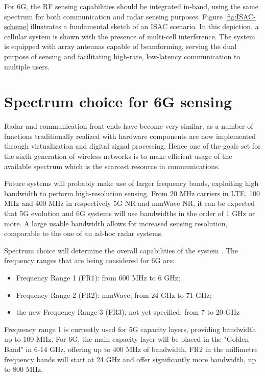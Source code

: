 For 6G, the RF sensing capabilities should be integrated in-band, using the same spectrum for both communication and radar sensing purposes. Figure \ref{fig:ISAC-scheme} illustrates a fundamental sketch of an ISAC scenario. In this depiction, a cellular system is shown with the presence of multi-cell interference. The system is equipped with array antennas capable of beamforming, serving the dual purpose of sensing and facilitating high-rate, low-latency communication to multiple users.

\section{Spectrum choice for 6G sensing}


Radar and communication front-ends have become very similar, as a number of functions traditionally realized with hardware components are now implemented through virtualization and digital signal processing. Hence one of the goals set for the sixth generation of wireless networks is to make efficient usage of the available spectrum which is the scarcest resource in communications.

Future systems will probably make use of larger frequency bands, exploiting high bandwidth to perform high-resolution sensing. From 20 MHz carriers in LTE, 100 MHz and 400 MHz in respectively 5G NR and mmWave NR, it can be expected that 5G evolution and 6G systems will use bandwidths in the order of 1 GHz or more. A large usable bandwidth allows for increased sensing resolution, comparable to the one of an ad-hoc radar systems.

Spectrum choice will determine the overall capabilities of the system \cite{Wild_Grudnitsky_Mandelli_Henninger_Guan_Schaich_2023}. The frequency ranges that are being considered for 6G \cite{Hexa} are:

\begin{itemize}
	\item Frequency Range 1 (FR1): from 600 MHz to 6 GHz;
	\item Frequency Range 2 (FR2): mmWave, from 24 GHz to 71 GHz;
	\item the new Frequency Range 3 (FR3), not yet specified: from 7 to 20 GHz
\end{itemize}

Frequency range 1 is currently used for 5G capacity layers, providing bandwidth up to 100 MHz. For 6G, the main capacity layer will be placed in the "Golden Band" in 6-14 GHz, offering up to 400 MHz of bandwidth. FR2 in the millimetre frequency bands will start at 24 GHz and offer significantly more bandwidth, up to 800 MHz.

